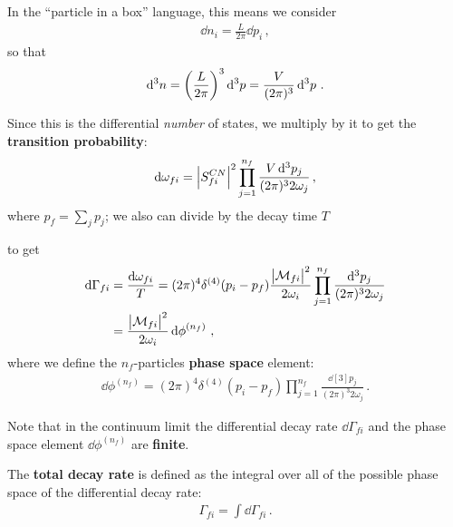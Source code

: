 \documentclass[main.tex]{subfiles}
\begin{document}
In the ``particle in a box'' language, this means we consider 
%
\begin{align}
\dd{n_i} = \frac{L}{2 \pi } \dd{p_i}
\,,
\end{align}
%
so that 
%
\begin{align}
\dd[3]{n} = \qty( \frac{L}{2 \pi })^3 \dd[3]{p} 
= \frac{V}{(2\pi )^3} \dd[3]{p} 
\,.
\end{align}


Since this is the differential \emph{number} of states, we multiply by it to get the \textbf{transition probability}:  
%
\begin{align}
\dd{\omega_{fi}} = \abs{S^{CN}_{fi}}^2 \prod_{j=1}^{n_f} \frac{V \dd[3]{p_j}}{(2\pi )^3 2 \omega_{j}}
\,,
\end{align}
%
where \(p_f = \sum_j p_j\); we also can divide by the decay time \(T\)


to get 
%
\begin{align}
\dd{\Gamma_{fi}} &= \frac{ \dd{\omega_{fi}}}{T} =
(2\pi )^{4} \delta^{(4)} (p_i - p_f) 
\frac{\abs{\mathcal{M}_{fi}}^2}{2 \omega_{i}}
\prod_{j=1}^{n_f} \frac{\dd[3]{p_j}}{(2\pi )^3 2 \omega_{j}}  \\
&= \frac{\abs{\mathcal{M}_{fi}}^2}{2 \omega_{i}} \dd{\phi}^{(n_f)}
\,,
\end{align}
%
where we define the \(n_f\)-particles \textbf{phase space} element: 
%
\begin{align}
\dd{\phi}^{(n_f)}
=
(2\pi )^{4} \delta^{(4)} (p_i - p_f) 
\prod_{j=1}^{n_f} \frac{\dd[3]{p_j}}{(2\pi )^3 2 \omega_{j}}
\,.
\end{align}

Note that in the continuum limit the differential decay rate \(\dd{\Gamma }_{fi}\) and the phase space element \(\dd{\phi }^{(n_f)}\) are \textbf{finite}. 

The \textbf{total decay rate} is defined as the integral over all of the possible phase space of the differential decay rate: 
%
\begin{align}
\Gamma_{fi} = \int \dd{\Gamma}_{fi}
\,.
\end{align}
\end{document}
